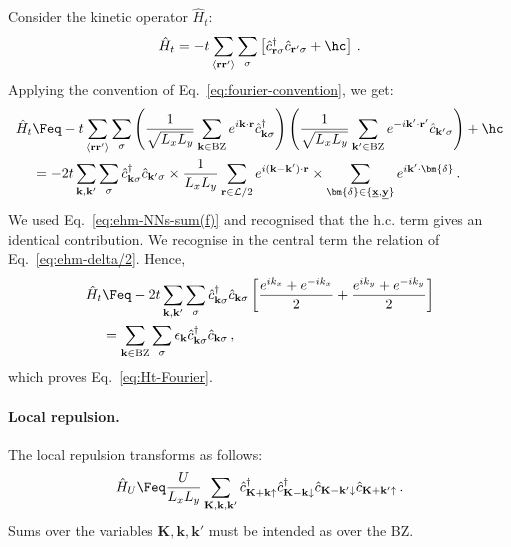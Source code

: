 \begin{tabproof}
	
	Consider the kinetic operator $\hat H_t$:
	\[
		\hat H_t = -t \sum_{\langle \mathbf{r}\mathbf{r}' \rangle} \sum_\sigma \left[
		\hat c_{\mathbf{r}\sigma}^\dagger \hat c_{\mathbf{r}'\sigma} + \hc
		\right] \, .
	\]
	Applying the convention of Eq.~\eqref{eq:fourier-convention}, we get:
	\[
	\begin{aligned}
		\hat H_t &\Feq -t \sum_{\langle \mathbf{r}\mathbf{r}' \rangle} \sum_\sigma \left(\frac{1}{\sqrt{L_xL_y}} \sum_{\mathbf{k}\in\mathrm{BZ}} e^{i\mathbf{k}\cdot\mathbf{r}} \hat c_{\mathbf{k}\sigma}^\dagger\right) \left(\frac{1}{\sqrt{L_xL_y}} \sum_{\mathbf{k}'\in\mathrm{BZ}} e^{-i\mathbf{k}'\cdot\mathbf{r}'} \hat c_{\mathbf{k}'\sigma} \right)+ \hc \\
		&= -2t\sum_{\mathbf{k},\mathbf{k}'} \sum_\sigma \hat c_{\mathbf{k}\sigma}^\dagger \hat c_{\mathbf{k}'\sigma} \times \frac{1}{L_x L_y} \sum_{\mathbf{r}\in\mathcal{L}/2} e^{i(\mathbf{k}-\mathbf{k}')\cdot\mathbf{r}} \times \sum_{\bm{\delta} \in \lbrace \underline{\mathbf{x}}, \underline{\mathbf{y}} \rbrace} e^{i \mathbf{k}' \cdot \bm{\delta}} \, .
	\end{aligned}
	\]
	We used Eq.~\eqref{eq:ehm-NNs-sum(f)} and recognised that the h.c. term gives an identical contribution. We recognise in the central term the relation of Eq.~\eqref{eq:ehm-delta/2}. Hence,
	\[
	\begin{aligned}
		\hat H_t &\Feq -2t\sum_{\mathbf{k},\mathbf{k}'} \sum_\sigma \hat c_{\mathbf{k}\sigma}^\dagger \hat c_{\mathbf{k}\sigma} \left[
			\frac{e^{i k_x}+e^{-i k_x}}{2} + \frac{e^{i k_y}+e^{-i k_y}}{2}
		\right] \\
		&= \sum_{\mathbf{k} \in \mathrm{BZ}} \sum_\sigma \epsilon_\mathbf{k} \hat c_{\mathbf{k}\sigma}^\dagger \hat c_{\mathbf{k}\sigma} \, ,
	\end{aligned}
	\]
	which proves Eq.~\eqref{eq:Ht-Fourier}.

\end{tabproof}

\paragraph{Local repulsion.}

The local repulsion transforms as follows:
\begin{equation}\label{eq:HU-fourier}
	\hat H_U \Feq \frac{U}{L_x L_y}
	\sum_{\mathbf{K}, \mathbf{k}, \mathbf{k}'} \hat c_{\mathbf{K}+\mathbf{k} \uparrow}^\dagger \hat c_{\mathbf{K}-\mathbf{k} \downarrow}^\dagger \hat c_{\mathbf{K}-\mathbf{k}' \downarrow} \hat c_{\mathbf{K}+\mathbf{k}' \uparrow} \, .
\end{equation}
Sums over the variables $\mathbf{K}, \mathbf{k}, \mathbf{k}'$ must be intended as over the BZ.


